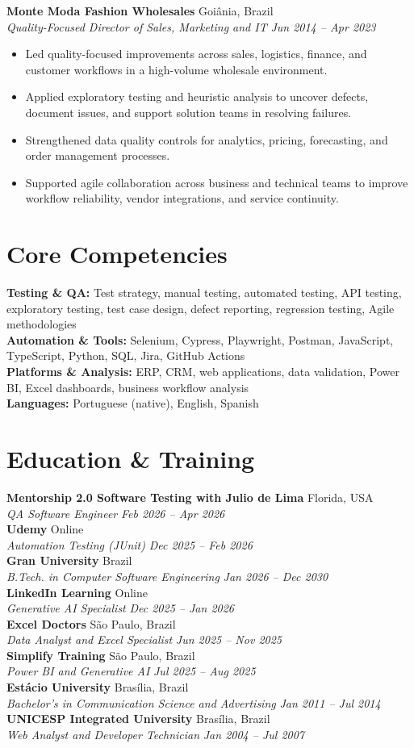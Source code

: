 \documentclass[10pt,letterpaper]{article}
\newcommand{\resumeSubheading}[4]{%
  \textbf{#1} \hfill #2\\
  \textit{#3} \hfill \textit{#4}\par
}
\newcommand{\resumeItem}[1]{\item #1}
\newcommand{\educationEntry}[4]{%
  \textbf{#1} \hfill #2\\
  \textit{#3} \hfill \textit{#4}\\[-1pt]
}
\begin{document}
\resumeSubheading{Monte Moda Fashion Wholesales}{Goi\^ania, Brazil}{Quality-Focused Director of Sales, Marketing and IT}{Jun 2014 -- Apr 2023}
\begin{itemize}
    \resumeItem{Led quality-focused improvements across sales, logistics, finance, and customer workflows in a high-volume wholesale environment.}
    \resumeItem{Applied exploratory testing and heuristic analysis to uncover defects, document issues, and support solution teams in resolving failures.}
    \resumeItem{Strengthened data quality controls for analytics, pricing, forecasting, and order management processes.}
    \resumeItem{Supported agile collaboration across business and technical teams to improve workflow reliability, vendor integrations, and service continuity.}
\end{itemize}

\section*{Core Competencies}
\textbf{Testing \& QA:} Test strategy, manual testing, automated testing, API testing, exploratory testing, test case design, defect reporting, regression testing, Agile methodologies\\
\textbf{Automation \& Tools:} Selenium, Cypress, Playwright, Postman, JavaScript, TypeScript, Python, SQL, Jira, GitHub Actions\\
\textbf{Platforms \& Analysis:} ERP, CRM, web applications, data validation, Power BI, Excel dashboards, business workflow analysis\\
\textbf{Languages:} Portuguese (native), English, Spanish

\section*{Education \& Training}
\educationEntry{Mentorship 2.0 Software Testing with Julio de Lima}{Florida, USA}{QA Software Engineer}{Feb 2026 -- Apr 2026}
\educationEntry{Udemy}{Online}{Automation Testing (JUnit)}{Dec 2025 -- Feb 2026}
\educationEntry{Gran University}{Brazil}{B.Tech. in Computer Software Engineering}{Jan 2026 -- Dec 2030}
\educationEntry{LinkedIn Learning}{Online}{Generative AI Specialist}{Dec 2025 -- Jan 2026}
\educationEntry{Excel Doctors}{S\~ao Paulo, Brazil}{Data Analyst and Excel Specialist}{Jun 2025 -- Nov 2025}
\educationEntry{Simplify Training}{S\~ao Paulo, Brazil}{Power BI and Generative AI}{Jul 2025 -- Aug 2025}
\educationEntry{Est\'acio University}{Bras\'ilia, Brazil}{Bachelor's in Communication Science and Advertising}{Jan 2011 -- Jul 2014}
\educationEntry{UNICESP Integrated University}{Bras\'ilia, Brazil}{Web Analyst and Developer Technician}{Jan 2004 -- Jul 2007}
\end{document}
